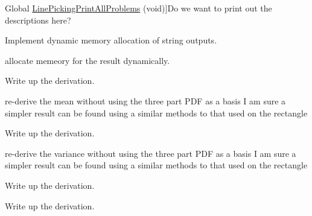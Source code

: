 \begin{DoxyRefList}
Global \hyperlink{group__api_ga1a1c27d3c46da382a0443f810628a8ac}{Line\-Picking\-Print\-All\-Problems} (void)]Do we want to print out the descriptions here?  
\item[\label{todo__todo000016}%
\hypertarget{todo__todo000016}{}%
Global \hyperlink{group__api_ga146eea4bf38bd6e3812ea47ae2ac57a7}{Line\-Picking\-Problem\-Lookup} (int $\ast$, char $\ast$$\ast$, char $\ast$$\ast$)]Implement dynamic memory allocation of string outputs.  
\item[\label{todo__todo000019}%
\hypertarget{todo__todo000019}{}%
Global \hyperlink{group__api_ga0aec0b2f87903f4bf4ad3011a99b3446}{Line\-Picking\-Support} (double $\ast$, int $\ast$, double $\ast$, int $\ast$, int $\ast$, char $\ast$$\ast$)]allocate memeory for the result dynamically.  
\item[\label{todo__todo000023}%
\hypertarget{todo__todo000023}{}%
Global \hyperlink{_prism_geodesic_8h_a8fb219075b27e66757a3b5c234097c4d}{Prism\-Geodesic\-Distance\-C\-D\-F} (double t, double $\ast$parameters)]Write up the derivation.  
\item[\label{todo__todo000024}%
\hypertarget{todo__todo000024}{}%
Global \hyperlink{_prism_geodesic_8h_a8ac24433806e383dec481431b92b4606}{Prism\-Geodesic\-Distance\-Mean} (double $\ast$parameters)]re-\/derive the mean without using the three part P\-D\-F as a basis I am sure a simpler result can be found using a similar methods to that used on the rectangle  
\item[\label{todo__todo000022}%
\hypertarget{todo__todo000022}{}%
Global \hyperlink{_prism_geodesic_8h_a674a98341a80a5b8589352280f89173c}{Prism\-Geodesic\-Distance\-P\-D\-F} (double t, double $\ast$parameters)]Write up the derivation.  
\item[\label{todo__todo000025}%
\hypertarget{todo__todo000025}{}%
Global \hyperlink{_prism_geodesic_8h_ac804282eeada51c4b8b2e2ae636d1bab}{Prism\-Geodesic\-Distance\-Var} (double $\ast$parameters)]re-\/derive the variance without using the three part P\-D\-F as a basis I am sure a simpler result can be found using a similar methods to that used on the rectangle  
\item[\label{todo__todo000026}%
\hypertarget{todo__todo000026}{}%
Global \hyperlink{_rectangle_8h_a1efe7711b068562816ebbe0af282f20b}{Rectangle\-Distance\-C\-D\-F} (double t, double $\ast$parameters)]Write up the derivation.  
\item[\label{todo__todo000028}%
\hypertarget{todo__todo000028}{}%
Global \hyperlink{_rectangle_manhattan_8h_adcd7815a45832662c0ba5b2733c19faa}{Rectangle\-Manhattan\-Distance\-C\-D\-F} (double t, double $\ast$parameters)]Write up the derivation.  
$$
\end{DoxyRefList}

